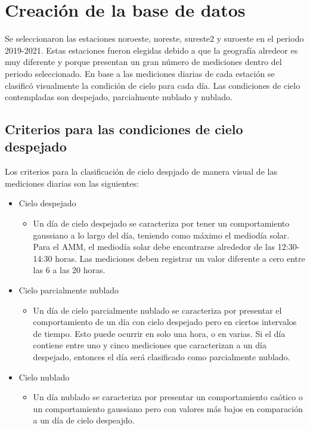 \section{Creación de la base de datos}

Se seleccionaron las estaciones noroeste, noreste, sureste2 y suroeste en el periodo 2019-2021. Estas estaciones fueron elegidas debido a que la geografía alredeor es muy diferente y porque presentan un gran número de mediciones dentro del periodo seleccionado. En base a las mediciones diarias de cada estación se clasificó visualmente la condición de cielo para cada día. Las condiciones de cielo contempladas son despejado, parcialmente nublado y nublado.

\subsection{Criterios para las condiciones de cielo despejado}

Los criterios para la clasificación de cielo despjado de manera visual de las mediciones diarias son las siguientes:

\begin{itemize}
	\item Cielo despejado
	      \begin{itemize}
		      \item Un día de cielo despejado se caracteriza por tener un comportamiento gaussiano a lo largo del día, teniendo como máximo el mediodía solar. Para el AMM, el mediodía solar debe encontrarse alrededor de las 12:30-14:30 horas. Las mediciones deben registrar un valor diferente a cero entre las 6 a las 20 horas.
	      \end{itemize}
	\item Cielo parcialmente nublado
	      \begin{itemize}
		      \item Un día de cielo parcialmente nublado se caracteriza por presentar el comportamiento de un día con cielo despejado pero en ciertos intervalos de tiempo. Esto puede ocurrir en solo una hora, o en varias. Si el día contiene entre uno y cinco mediciones que caracterizan a un día despejado, entonces el día será clasificado como parcialmente nublado.
	      \end{itemize}
	\item Cielo nublado
	      \begin{itemize}
		      \item Un día nublado se caracteriza por presentar un comportamiento caótico o un comportamiento gaussiano pero con valores más bajos en comparación a un día de cielo despeajdo.
	      \end{itemize}
\end{itemize}

